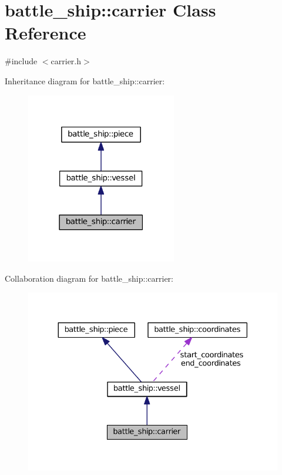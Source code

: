 \hypertarget{classbattle__ship_1_1carrier}{}\section{battle\+\_\+ship\+:\+:carrier Class Reference}
\label{classbattle__ship_1_1carrier}


{\ttfamily \#include $<$carrier.\+h$>$}



Inheritance diagram for battle\+\_\+ship\+:\+:carrier\+:
\nopagebreak
\begin{figure}[H]
\begin{center}
\leavevmode
\includegraphics[width=186pt]{classbattle__ship_1_1carrier__inherit__graph}
\end{center}
\end{figure}


Collaboration diagram for battle\+\_\+ship\+:\+:carrier\+:
\nopagebreak
\begin{figure}[H]
\begin{center}
\leavevmode
\includegraphics[width=330pt]{classbattle__ship_1_1carrier__coll__graph}
\end{center}
\end{figure}
